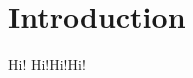 \documentclass[10pt,twocolumn]{article}
\begin{document}
\section{Introduction}
Hi! Hi!Hi!Hi!
\end{document}
